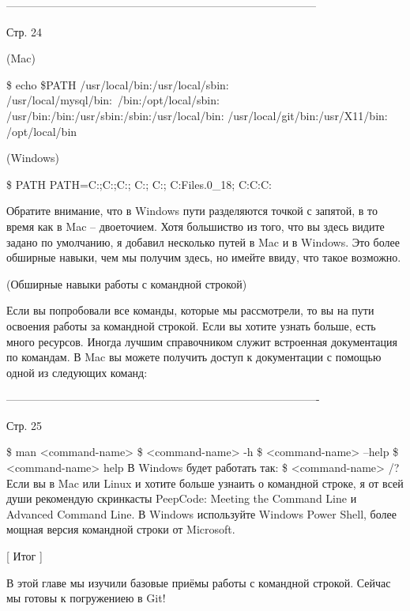  ------------------------------------------------------------------------------------

 Стр. 24

 (Mac)

 \$ echo \$PATH
/usr/local/bin:/usr/local/sbin:
/usr/local/mysql/bin:~/bin:/opt/local/sbin:
/usr/bin:/bin:/usr/sbin:/sbin:/usr/local/bin:
/usr/local/git/bin:/usr/X11/bin:
/opt/local/bin

(Windows)

\$ PATH
PATH=C:\Perl\site\bin;C:\Perl\bin;C:\Windows{};
C:\Windows;
C:\Windows{}\Wbem;
C:\Program Files\Java{}.0_18\bin;
C:\tools\;C:\;C:\bin

Обратите внимание, что в Windows пути разделяются точкой с запятой, в то время как
в Mac -- двоеточием. Хотя большиство из того, что вы здесь видите задано по умолчанию,
я добавил несколько путей в Mac и в Windows. Это более обширные навыки, чем мы получим 
здесь, но имейте ввиду, что такое возможно.

(Обширные навыки работы с командной строкой)

Если вы попробовали все команды, которые мы рассмотрели, то вы на пути освоения работы
за командной строкой. Если вы хотите узнать больше, есть много ресурсов. Иногда лучшим
справочником служит встроенная документация по командам. В Mac вы можете получить
доступ к документации с помощью одной из следующих команд:

-------------------------------------------------------------------------------------

Стр. 25

\$ man <command-name>
\$ <command-name> -h
\$ <command-name> --help
\$ <command-name> help
В Windows будет работать так:
\$ <command-name> /?
Если вы в Mac или Linux и хотите больше узнаить о командной строке, я от всей души
рекомендую скринкасты PeepCode: Meeting the Command Line и Advanced Command Line.
В Windows используйте Windows Power Shell, более мощная версия командной строки от
Microsoft.

[ Итог ]

В этой главе мы изучили базовые приёмы работы с командной строкой. Сейчас мы готовы
к погружениею в Git!